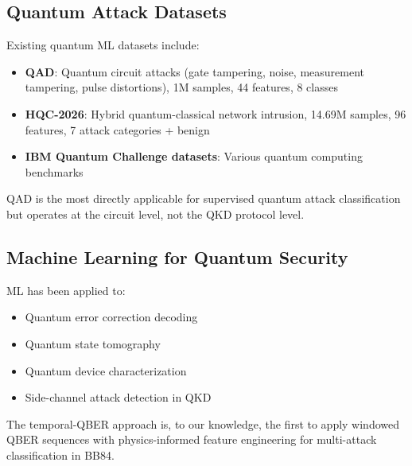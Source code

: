 \subsection{Quantum Attack Datasets}
Existing quantum ML datasets include:
\begin{itemize}
    \item \textbf{QAD}: Quantum circuit attacks (gate tampering, noise, measurement tampering, pulse distortions), 1M samples, 44 features, 8 classes
    \item \textbf{HQC-2026}: Hybrid quantum-classical network intrusion, 14.69M samples, 96 features, 7 attack categories + benign
    \item \textbf{IBM Quantum Challenge datasets}: Various quantum computing benchmarks
\end{itemize}

QAD is the most directly applicable for supervised quantum attack classification but operates at the circuit level, not the QKD protocol level.

\subsection{Machine Learning for Quantum Security}
ML has been applied to:
\begin{itemize}
    \item Quantum error correction decoding
    \item Quantum state tomography
    \item Quantum device characterization
    \item Side-channel attack detection in QKD
\end{itemize}

The temporal-QBER approach is, to our knowledge, the first to apply windowed QBER sequences with physics-informed feature engineering for multi-attack classification in BB84.